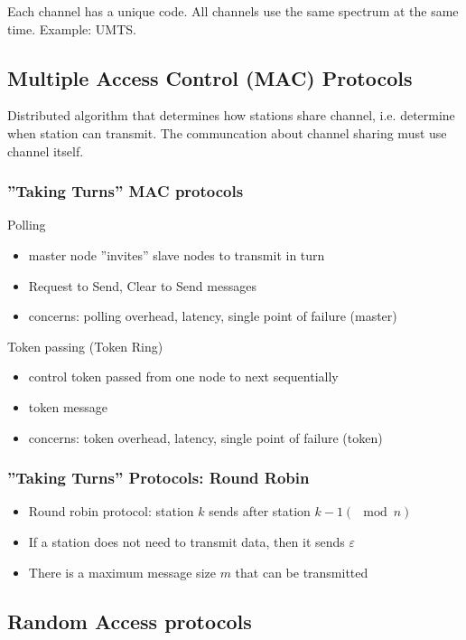 \documentclass[10pt, a4paper, twocolumn]{scrartcl}
\begin{document}
Each channel has a unique code. All channels use the same spectrum at the same time. Example: UMTS.


\subsection{Multiple Access Control (MAC) Protocols}

Distributed algorithm that determines how stations share channel, i.e. determine when station can transmit. The communcation about channel sharing must use channel itself.

\subsubsection{''Taking Turns'' MAC protocols}

Polling
\begin{itemize}
	\item master node ''invites'' slave nodes to transmit in turn
	\item Request to Send, Clear to Send messages
	\item concerns: polling overhead, latency, single point of failure (master)
\end{itemize}

Token passing (Token Ring)
\begin{itemize}
	\item control token passed from one node to next sequentially
	\item token message
	\item concerns: token overhead, latency, single point of failure (token)
\end{itemize}

\subsubsection{''Taking Turns'' Protocols: Round Robin}

\begin{itemize}
	\item Round robin protocol: station $k$ sends after station $k-1 (\mod n)$
	\item If a station does not need to transmit data, then it sends $\varepsilon$
	\item There is a maximum message size $m$ that can be transmitted
\end{itemize}

\subsection{Random Access protocols}
\end{document}
